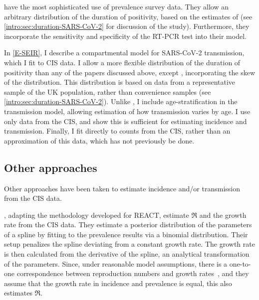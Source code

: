 \documentclass[thesis.tex]{subfiles}
\begin{document}
\Textcite{nicholsonImproving} have the most sophisticated use of prevalence survey data.
They allow an arbitrary distribution of the duration of positivity, based on the estimates of \textcite{hellewellPCRSensitivity} (see \cref{intro:sec:duration-SARS-CoV-2} for discussion of the \textcite{hellewellPCRSensitivity} study).
Furthermore, they incorporate the sensitivity and specificity of the RT-PCR test into their model.

In \cref{E-SEIR}, I describe a compartmental model for SARS-CoV-2 transmission, which I fit to CIS data.
I allow a more flexible distribution of the duration of positivity than any of the papers discussed above, except \textcite{nicholsonImproving}, incorporating the skew of the distribution.
This distribution is based on data from a representative sample of the UK population, rather than convenience samples (see \cref{intro:sec:duration-SARS-CoV-2}).
Unlike \textcite{nicholsonImproving}, I include age-stratification in the transmission model, allowing estimation of how transmission varies by age.
I use only data from the CIS, and show this is sufficient for estimating incidence and transmission.
Finally, I fit directly to counts from the CIS, rather than an approximation of this data, which has not previously be done.

\subsection{Other approaches}

Other approaches have been taken to estimate incidence and/or transmission from the CIS data.

\Textcite{mccabeCISincidence}, adapting the methodology \textcite{ealesAppropriately} developed for REACT, estimate $\Re$ and the growth rate from the CIS data.
They estimate a posterior distribution of the parameters of a spline by fitting to the prevalence results via a binomial distribution.
Their setup penalizes the spline deviating from a constant growth rate.
The growth rate is then calculated from the derivative of the spline, an analytical transformation of the parameters.
Since, under reasonable model assumptions, there is a one-to-one correspondence between reproduction numbers and growth rates~\autocite{wallingaGI}, and they assume that the growth rate in incidence and prevalence is equal, this also estimates $\Re$.
\end{document}
